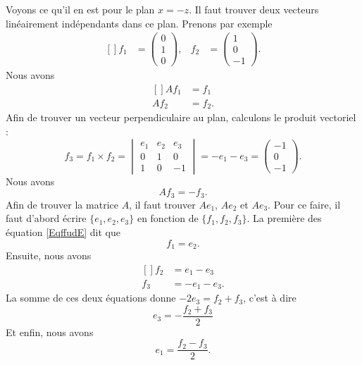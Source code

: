 Voyons ce qu'il en est pour le plan $x=-z$. Il faut trouver deux vecteurs linéairement indépendants dans ce plan. Prenons par exemple
\begin{equation}		\label{EqffudE}
	\begin{aligned}[]
		f_1&=\begin{pmatrix}
			0	\\ 
			1	\\ 
			0	
		\end{pmatrix},&f_2&=\begin{pmatrix}
			1	\\ 
			0	\\ 
			-1	
		\end{pmatrix}.
	\end{aligned}
\end{equation}
Nous avons 
\begin{equation}
	\begin{aligned}[]
		Af_1&=f_1\\
		Af_2&=f_2.
	\end{aligned}
\end{equation}
Afin de trouver un vecteur perpendiculaire au plan, calculons le produit vectoriel :
\begin{equation}
	f_3=f_1\times f_2=\begin{vmatrix}
		e_1	&	e_2	&	e_3	\\
		0	&	1	&	0	\\
		1	&	0	&	-1
	\end{vmatrix}=-e_1-e_3=\begin{pmatrix}
		-1	\\ 
		0	\\ 
		-1	
	\end{pmatrix}.
\end{equation}
Nous avons 
\begin{equation}
	Af_3=-f_3.
\end{equation}
Afin de trouver la matrice $A$, il faut trouver $Ae_1$, $Ae_2$ et $Ae_3$. Pour ce faire, il faut d'abord écrire $\{ e_1,e_2,e_3 \}$ en fonction de $\{ f_1,f_2,f_3 \}$. La première des équation \eqref{EqffudE} dit que 
\begin{equation}
	f_1=e_2.
\end{equation}
Ensuite, nous avons
\begin{equation}
	\begin{aligned}[]
		f_2&=e_1-e_3\\
		f_3&=-e_1-e_3.
	\end{aligned}
\end{equation}
La somme de ces deux équations donne $-2e_3=f_2+f_3$, c'est à dire
\begin{equation}
	e_3=-\frac{ f_2+f_3 }{ 2 }
\end{equation}
Et enfin, nous avons
\begin{equation}
	e_1=\frac{ f_2-f_3 }{ 2 }.
\end{equation}

